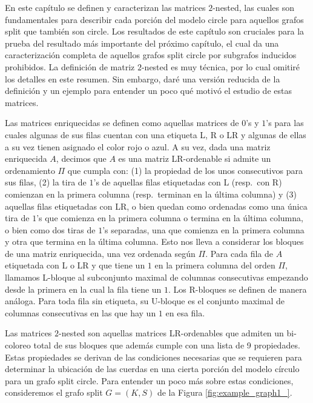 \documentclass[12pt]{book}
\theoremstyle{plain}
\theoremstyle{remark}
\begin{document}
En este capítulo se definen y caracterizan las matrices $2$-nested, las cuales son fun\-da\-men\-ta\-les para describir cada porción del modelo circle para aquellos grafos split que también son circle. 
Los resultados de este capítulo son cruciales para la prueba del resultado más importante del próximo capítulo, el cual da una caracterización completa de aquellos grafos split circle por subgrafos inducidos prohibidos.
La definición de matriz $2$-nested es muy técnica, por lo cual omitiré los detalles en este resumen. Sin embargo, daré una versión reducida de la definición y un ejemplo para entender un poco qué motivó el estudio de estas matrices.

Las matrices enriquecidas se definen como aquellas matrices de $0$'s y $1$'s para las cuales algunas de sus filas cuentan con una etiqueta L, R o LR y algunas de ellas a su vez tienen asignado el color rojo o azul.
A su vez, dada una matriz enriquecida $A$, decimos que $A$ es una matriz LR-ordenable si admite un ordenamiento $\Pi$ que cumpla con: (1) la propiedad de los unos consecutivos para sus filas, (2) la tira de $1$'s de aquellas filas etiquetadas con L (resp.\ con R) comienzan en la primera columna (resp.\ terminan en la última columna) y (3) aquellas filas etiquetadas con LR, o bien quedan como ordenadas como una única tira de $1$'s que comienza en la primera columna o termina en la última columna, o bien como dos tiras de $1$'s separadas, una que comienza en la primera columna y otra que termina en la última columna.  %
Esto nos lleva a considerar los bloques de una matriz enriquecida, una vez ordenada según $\Pi$. Para cada fila de $A$ etiquetada con L o LR y que tiene un $1$ en la primera columna del orden $\Pi$, llamamos L-bloque al subconjunto maximal de columnas consecutivas empezando desde la primera en la cual la fila tiene un $1$. Los R-bloques se definen de manera análoga. Para toda fila sin etiqueta, su U-bloque es el conjunto maximal de columnas consecutivas en las que hay un $1$ en esa fila.

Las matrices $2$-nested son aquellas matrices LR-ordenables que admiten un bi-coloreo total de sus bloques que además cumple con una lista de 9 propiedades.
Estas propiedades se derivan de las condiciones necesarias que se requieren para determinar la ubicación de las cuerdas en una cierta porción del modelo círculo para un grafo split circle.
Para entender un poco más sobre estas condiciones, consideremos el grafo split $G=(K,S)$ de la Figura \ref{fig:example_graph1_}. 
\end{document}
